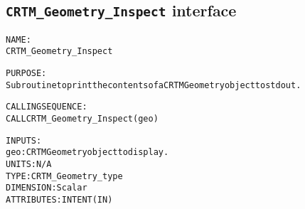 \subsection{\texttt{CRTM\_Geometry\_Inspect} interface}
  \label{sec:CRTM_Geometry_Inspect_interface}
  \begin{alltt}
 
  NAME:
        CRTM_Geometry_Inspect
 
  PURPOSE:
        Subroutine to print the contents of a CRTM Geometry object to stdout.
 
  CALLING SEQUENCE:
        CALL CRTM_Geometry_Inspect( geo )
 
  INPUTS:
        geo:  CRTM Geometry object to display.
              UNITS:      N/A
              TYPE:       CRTM_Geometry_type
              DIMENSION:  Scalar
              ATTRIBUTES: INTENT(IN)
 
  \end{alltt}
